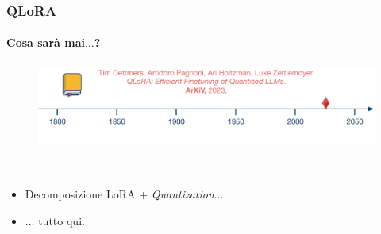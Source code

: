 %
\begin{frame}[t] \frametitle{QLoRA}
{\small
{}
\framesubtitle{Cosa sarà mai$\ldots$?}
\vspace*{-.5cm}
    \begin{minipage}[t]{\textwidth}
        \begin{figure}[ht]
            \centering
            \includegraphics[width=\textwidth]{img/AI-timeline-2023.png}
        \end{figure}
    \end{minipage}
    \\\vspace*{.3cm}
    \begin{minipage}[t]{\textwidth}
        \begin{itemize}[leftmargin=10pt,align=right]
            \item[\alert{\faArrowCircleRight}] Decomposizione LoRA + \emph{Quantization}$\ldots$
            \item[\alert{\faArrowCircleRight}] $\ldots$ tutto qui.
        \end{itemize}
    \end{minipage}
}
\end{frame}
%